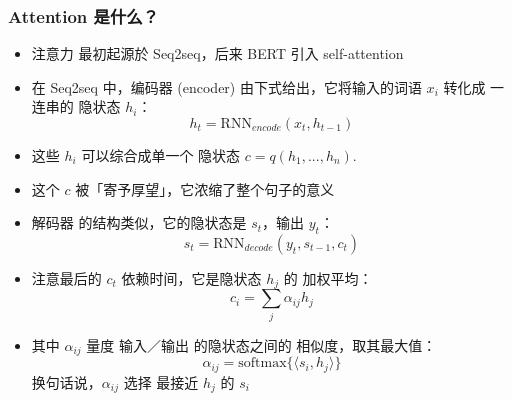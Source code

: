 \documentclass[16pt]{beamer}
\newcommand{\emp}[1]{{\color{violet}#1}}
\begin{document}
\begin{frame}
\begin{itemize}
	
	
	
	
	
\end{itemize}
\end{frame}

\begin{frame}
\frametitle{Attention 是什么？}
\begin{itemize}
\item 注意力 最初起源於 Seq2seq，后来 BERT 引入 self-attention

\item 在 Seq2seq 中，编码器 (encoder) 由下式给出，它将输入的词语 $x_i$ 转化成 一连串的 隐状态 $h_i$：
\begin{equation}
h_t = \mbox{RNN}_{encode}(x_t, h_{t-1})
\end{equation}

\item 这些 $h_i$ 可以综合成单一个 隐状态 $c = q(h_1, ..., h_n)$. 

\item 这个 $c$ 被「寄予厚望」，它浓缩了整个句子的意义

\item 解码器 的结构类似，它的隐状态是 $s_t$，输出 $y_t$：
\begin{equation}
s_t = \mbox{RNN}_{decode}(y_t, s_{t-1}, c_t)
\end{equation}

\item 注意最后的 $c_t$ 依赖时间，它是隐状态 $h_j$ 的 \emp{加权平均}：
\begin{equation}
c_i = \sum_j \alpha_{ij} h_j
\end{equation}

\item 其中 $\alpha_{ij}$ 量度 输入／输出 的隐状态之间的 \emp{相似度}，取其最大值：
\begin{equation}
\alpha_{ij} = \mbox{softmax} \{ \langle s_i, h_j \rangle \}
\end{equation}
换句话说，$\alpha_{ij}$ \emp{选择} 最接近 $h_j$ 的 $s_i$
\end{itemize}
\end{frame}
\end{document}
